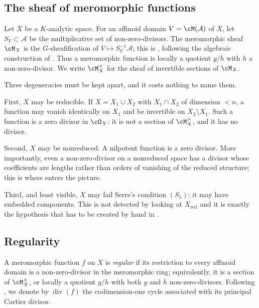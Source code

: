 \subsection{The sheaf of meromorphic functions}
\label{sec:ch15-meromorphic-sheaf}

Let $X$ be a $K$-analytic space.  For an affinoid domain
$V=\cM(\mathcal A)$ of $X$, let $S_V\subset\mathcal A$ be the multiplicative
set of non-zero-divisors.  The meromorphic sheaf $\cM_X$ is the
$G$-sheafification of $V\mapsto S_V^{-1}\mathcal A$; this is
\cite[\S13.6.2--13.6.5]{CLD25}, following the algebraic construction of
\cite[20.1.8]{EGAIV4}.  Thus a meromorphic function is locally a quotient
$g/h$ with $h$ a non-zero-divisor.  We write $\cM_X^\times$ for the sheaf of
invertible sections of $\cM_X$.

Three degeneracies must be kept apart, and it costs nothing to name them.

First, $X$ may be reducible.  If $X=X_1\cup X_2$ with $X_1\cap X_2$ of
dimension $<n$, a function may vanish identically on $X_1$ and be invertible
on $X_2\setminus X_1$.  Such a function is a zero divisor in $\cO_X$: it is
not a section of $\cM_X^\times$, and it has no divisor.

Second, $X$ may be nonreduced.  A nilpotent function is a zero divisor.  More
importantly, even a non-zero-divisor on a nonreduced space has a divisor
whose coefficients are lengths rather than orders of vanishing of the reduced
structure; this is where  enters the
picture.

Third, and least visible, $X$ may fail Serre's condition $(S_1)$: it may have
embedded components.  This is not detected by looking at $X_{\mathrm{red}}$
and it is exactly the hypothesis that has to be created by hand in
.

\subsection{Regularity}

\begin{definition}
\label{def:ch15-regular-meromorphic}
A meromorphic function $f$ on $X$ is \emph{regular} if its restriction to
every affinoid domain is a non-zero-divisor in the meromorphic ring;
equivalently, it is a section of $\cM_X^\times$, or locally a quotient $g/h$
with both $g$ and $h$ non-zero-divisors.  Following
\cite[\S13.7]{CLD25}, we denote by $\operatorname{div}(f)$ the
codimension-one cycle associated with its principal Cartier divisor.
\end{definition}

